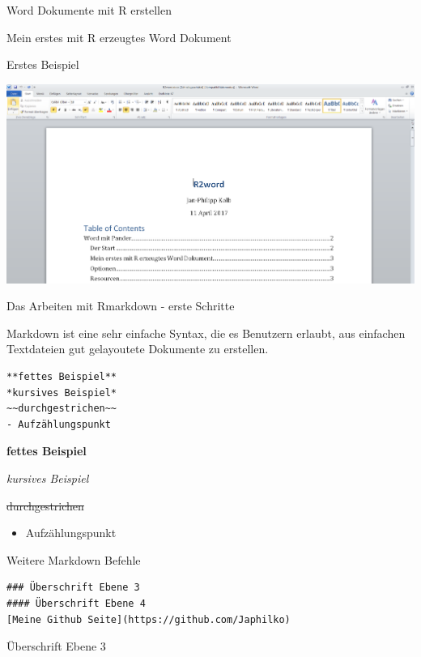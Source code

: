 \documentclass[ignorenonframetext,]{beamer}
\providecommand{\tightlist}{%
\setlength{\itemsep}{0pt}\setlength{\parskip}{0pt}}
\begin{document}
\begin{frame}[fragile]{Word Dokumente mit R erstellen}
\begin{block}{Mein erstes mit R erzeugtes Word Dokument}
\end{block}

\begin{block}{Erstes Beispiel}

\includegraphics{./tex2pdf.9796/f4f53ebbec0e266cea1febc80003dc7c93085030.png}

\end{block}

\begin{block}{Das Arbeiten mit Rmarkdown - erste Schritte}

Markdown ist eine sehr einfache Syntax, die es Benutzern erlaubt, aus
einfachen Textdateien gut gelayoutete Dokumente zu erstellen.

\begin{verbatim}
**fettes Beispiel**
*kursives Beispiel*
~~durchgestrichen~~
- Aufzählungspunkt
\end{verbatim}

\textbf{fettes Beispiel}

\emph{kursives Beispiel}

\sout{durchgestrichen}

\begin{itemize}
\tightlist
\item
  Aufzählungspunkt
\end{itemize}

\end{block}

\begin{block}{Weitere Markdown Befehle}

\begin{verbatim}
### Überschrift Ebene 3
#### Überschrift Ebene 4
[Meine Github Seite](https://github.com/Japhilko)
\end{verbatim}

\begin{block}{Überschrift Ebene 3}


\end{block}
\end{block}
\end{frame}
\end{document}
